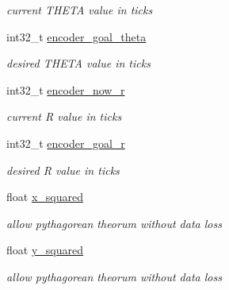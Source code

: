 \begin{DoxyCompactItemize}
\begin{DoxyCompactList}\small\item\em current T\-H\-E\-T\-A value in ticks \end{DoxyCompactList}\item 
\hypertarget{classpoint_a220965afba5b943647be961d3143da6f}{int32\-\_\-t \hyperlink{classpoint_a220965afba5b943647be961d3143da6f}{encoder\-\_\-goal\-\_\-theta}}\label{classpoint_a220965afba5b943647be961d3143da6f}

\begin{DoxyCompactList}\small\item\em desired T\-H\-E\-T\-A value in ticks \end{DoxyCompactList}\item 
\hypertarget{classpoint_a376d5c50a90d08b3b995c192659105c1}{int32\-\_\-t \hyperlink{classpoint_a376d5c50a90d08b3b995c192659105c1}{encoder\-\_\-now\-\_\-r}}\label{classpoint_a376d5c50a90d08b3b995c192659105c1}

\begin{DoxyCompactList}\small\item\em current R value in ticks \end{DoxyCompactList}\item 
\hypertarget{classpoint_ad76d03a1ffcd990690378ebeaf9f135f}{int32\-\_\-t \hyperlink{classpoint_ad76d03a1ffcd990690378ebeaf9f135f}{encoder\-\_\-goal\-\_\-r}}\label{classpoint_ad76d03a1ffcd990690378ebeaf9f135f}

\begin{DoxyCompactList}\small\item\em desired R value in ticks \end{DoxyCompactList}\item 
\hypertarget{classpoint_a79c3aa21753d18cbfe8bafa014e22288}{float \hyperlink{classpoint_a79c3aa21753d18cbfe8bafa014e22288}{x\-\_\-squared}}\label{classpoint_a79c3aa21753d18cbfe8bafa014e22288}

\begin{DoxyCompactList}\small\item\em allow pythagorean theorum without data loss \end{DoxyCompactList}\item 
\hypertarget{classpoint_a72284610ff2d533dec937957508ab8b9}{float \hyperlink{classpoint_a72284610ff2d533dec937957508ab8b9}{y\-\_\-squared}}\label{classpoint_a72284610ff2d533dec937957508ab8b9}

\begin{DoxyCompactList}\small\item\em allow pythagorean theorum without data loss \end{DoxyCompactList}\end{DoxyCompactItemize}


